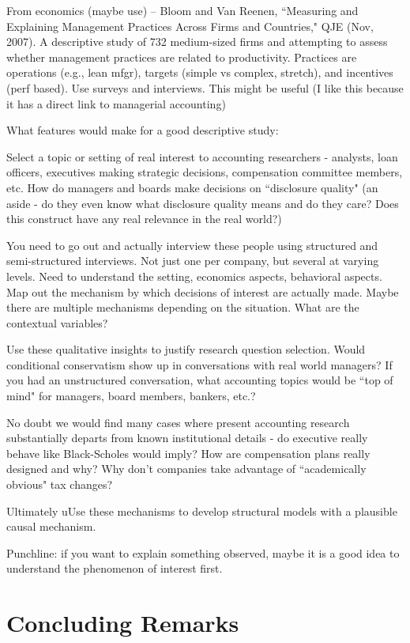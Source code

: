 \documentclass[11pt,reqno]{amsart}
\begin{document}
From economics (maybe use) -- Bloom and Van Reenen, ``Measuring and Explaining Management Practices Across Firms and Countries," QJE (Nov, 2007).  A descriptive study of 732 medium-sized firms and attempting to assess whether management practices are related to productivity.  Practices are operations (e.g., lean mfgr), targets (simple vs complex, stretch), and incentives (perf based).  Use surveys and interviews.  This might be useful (I like this because it has a direct link to managerial accounting)


What features would make for a good descriptive study:

Select a topic or setting of real interest to accounting researchers - analysts, loan officers, executives making strategic decisions, compensation committee members, etc. 
How do managers and boards make decisions on ``disclosure quality" (an aside - do they even know what disclosure quality means and do they care?  Does this construct have any real relevance in the real world?)  

You need to go out and actually interview these people using structured and semi-structured interviews.  Not just one per company, but several at varying levels.
Need to understand the setting, economics aspects, behavioral aspects.
Map out the mechanism by which decisions of interest are actually made.
Maybe there are multiple mechanisms depending on the situation.
What are the contextual variables?

Use these qualitative insights to justify research question selection.  Would conditional conservatism show up in conversations with real world managers?  If you had an unstructured conversation, what accounting topics would be ``top of mind" for managers, board members, bankers, etc.?

No doubt we would find many cases where present accounting research substantially departs from known institutional details - do executive really behave like Black-Scholes would imply?
How are compensation plans really designed and why?  Why don’t companies take advantage of ``academically obvious" tax changes?

Ultimately uUse these mechanisms to develop structural models with a plausible causal mechanism.

Punchline: if you want to explain something observed, maybe it is a good idea to understand the phenomenon of interest first.




\section{Concluding Remarks}
\end{document}
